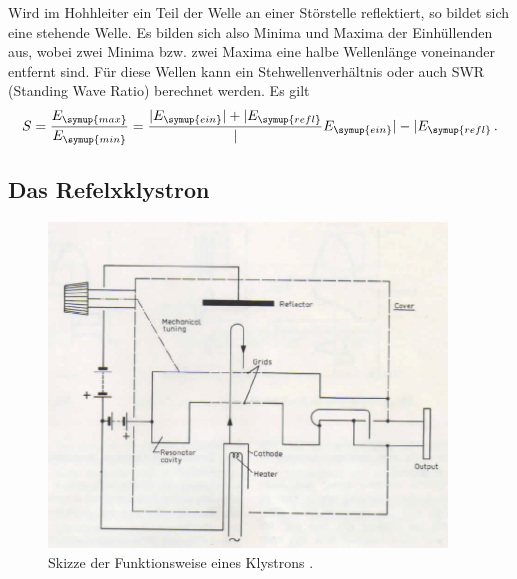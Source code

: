 Wird im Hohhleiter ein Teil der Welle an einer Störstelle reflektiert, so bildet
sich eine stehende Welle. Es bilden sich also Minima und Maxima der Einhüllenden
aus, wobei zwei Minima bzw. zwei Maxima eine halbe Wellenlänge voneinander entfernt
sind. Für diese Wellen kann ein Stehwellenverhältnis oder auch SWR (Standing Wave
Ratio) berechnet werden. Es gilt
\begin{equation}
  S=\frac{E_{\symup{max}}}{E_{\symup{min}}}=\frac{|E_{\symup{ein}}|+|E_{\symup{refl}}}
  |{E_{\symup{ein}}|-|E_{\symup{refl}}}\,.
\end{equation}


\subsection{Das Refelxklystron}
\label{subsec:klystron}

\begin{figure}
  \centering
  \includegraphics[width=300pt]{data/klystron.png}
  \caption{Skizze der Funktionsweise eines Klystrons \cite{Versuchsanleitung_alt}.}
  \label{fig:klystron}
\end{figure}
